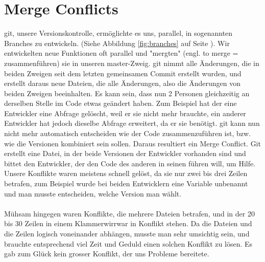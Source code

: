 \documentclass[11pt,a4paper]{scrbook}
\begin{document}
\section{Merge Conflicts}
git, unsere Versionskontrolle, ermöglichte es uns, parallel, in sogenannten Branches zu entwickeln. (Siehe Abbildung \ref{fig:branches} auf Seite \pageref{fig:branches}). Wir entwickelten neue Funktionen oft parallel und "mergten" (engl. to merge = zusammenführen) sie in unseren master-Zweig.
git nimmt alle Änderungen, die in beiden Zweigen seit dem letzten gemeinsamen Commit erstellt wurden, und erstellt daraus neue Dateien, die alle Änderungen,
also die Änderungen von beiden Zweigen beeinhalten. Es kann sein, dass nun 2 Personen gleichzeitig an derselben Stelle im Code etwas geändert haben. Zum Beispiel
hat der eine Entwickler eine Abfrage gelöscht, weil er sie nicht mehr brauchte, ein anderer Entwickler hat jedoch dieselbe Abfrage erweitert, da er sie benötigt.
git kann nun nicht mehr automatisch entscheiden wie der Code zusammenzuführen ist, bzw. wie die Versionen kombiniert sein sollen. Daraus resultiert ein Merge
Conflict. Git erstellt eine Datei, in der beide Versionen der Entwickler vorhanden sind und bittet den Entwickler, der den Code des anderen in seinen führen
will, um Hilfe. Unsere Konflikte waren meistens schnell gelöst, da sie nur zwei bis drei Zeilen betrafen, zum Beispiel wurde bei beiden Entwicklern
eine Variable unbenannt und man musste entscheiden, welche Version man wählt.\\
\\
Mühsam hingegen waren Konflikte, die mehrere Dateien betrafen, und in der 20 bis 30 Zeilen in einem Klammerwirrwar in Konflikt stehen. Da die Dateien und die Zeilen
logisch voneinander abhängen, musste man sehr umsichtig sein, und brauchte entsprechend viel Zeit und Geduld einen solchen Konflikt zu lösen. Es gab zum Glück kein
grosser Konflikt, der uns Probleme bereitete.
\end{document}
